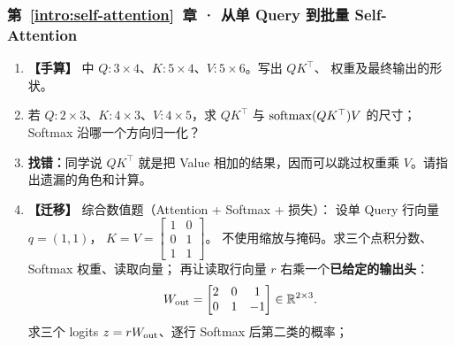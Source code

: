 \subsubsection*{第~\ref*{intro:self-attention}~章 · 从单 Query 到批量 Self-Attention}
\begin{enumerate}[label={},leftmargin=4.8em,itemsep=4pt]
\item[\textbf{C-062.}] \leavevmode{}\label{exercise:C-062}\label{exercise:attention-shapes}\textbf{【手算】}  中 $Q:3\times4$、$K:5\times4$、$V:5\times6$。写出 $QK^\top$、 权重及最终输出的形状。
\item[\textbf{C-063.}] \leavevmode{}\label{exercise:C-063}\label{exercise:cross-attention-shapes}若 $Q:2\times3$、$K:4\times3$、$V:4\times5$，求 $QK^\top$ 与 $\operatorname{softmax}(QK^\top)V$ 的尺寸；Softmax 沿哪一个方向归一化？
\item[\textbf{C-064.}] \leavevmode{}\label{exercise:C-064}\label{exercise:score-value-confusion}\textbf{找错：}同学说 $QK^\top$ 就是把 Value 相加的结果，因而可以跳过权重乘 $V$。请指出遗漏的角色和计算。
\item[\textbf{C-065.}] \leavevmode{}\label{exercise:C-065}\label{exercise:attention-loss-transfer}\textbf{【迁移】} 综合数值题（Attention + Softmax + 损失）：
设单 Query 行向量 $q=(1,1)$，
$K=V=\begin{bmatrix}1&0\\0&1\\1&1\end{bmatrix}$。
不使用缩放与掩码。求三个点积分数、Softmax 权重、读取向量；
再让读取行向量 $r$ 右乘一个\textbf{已给定的输出头}：
\[
W_{\rm out}=\begin{bmatrix}
2&0&1\\0&1&-1
\end{bmatrix}\in\mathbb{R}^{2\times3}.
\]
求三个 logits $z=rW_{\rm out}$、逐行 Softmax 后第二类的概率；

\end{enumerate}
